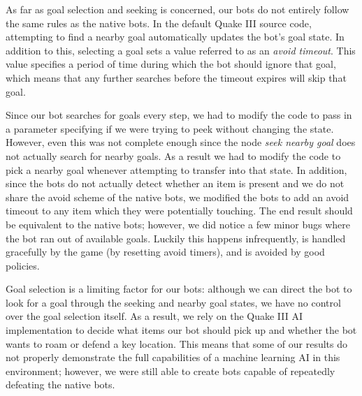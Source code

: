 As far as goal selection and seeking is concerned, our bots do not entirely follow the same rules as the native bots. In the default Quake III source code, attempting to find a nearby goal automatically updates the bot's goal state. In addition to this, selecting a goal sets a value referred to as an \emph{avoid timeout}. This value specifies a period of time during which the bot should ignore that goal, which means that any further searches before the timeout expires will skip that goal. 

Since our bot searches for goals every step, we had to modify the code to pass in a parameter specifying if we were trying to peek without changing the state. However, even this was not complete enough since the node \emph{seek nearby goal} does not actually search for nearby goals. As a result we had to modify the code to pick a nearby goal whenever attempting to transfer into that state. In addition, since the bots do not actually detect whether an item is present and we do not share the avoid scheme of the native bots, we modified the bots to add an avoid timeout to any item which they were potentially touching. The end result should be equivalent to the native bots; however, we did notice a few minor bugs where the bot ran out of available goals. Luckily this happens infrequently, is handled gracefully by the game (by resetting avoid timers), and is avoided by good policies.

Goal selection is a limiting factor for our bots: although we can direct the bot to look for a goal through the seeking and nearby goal states, we have no control over the goal selection itself. As a result, we rely on the Quake III AI implementation to decide what items our bot should pick up and whether the bot wants to roam or defend a key location. This means that some of our results do not properly demonstrate the full capabilities of a machine learning AI in this environment; however, we were still able to create bots capable of repeatedly defeating the native bots.